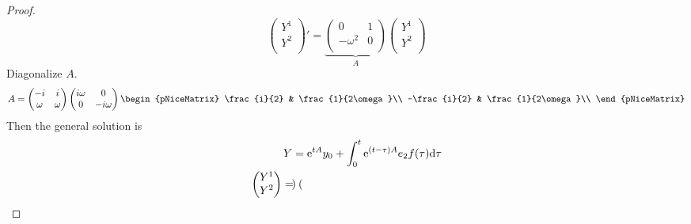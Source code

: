 \documentclass[../psets.tex]{subfiles}
\begin{document}
\begin{enumerate}
\begin{proof}
        \begin{equation*}
            \begin{pmatrix}
                Y^1\\
                Y^2\\
            \end{pmatrix}'
            = \underbrace{
                \begin{pmatrix}
                    0 & 1\\
                    -\omega^2 & 0\\
                \end{pmatrix}
            }_A
            \begin{pmatrix}
                Y^1\\
                Y^2\\
            \end{pmatrix}
        \end{equation*}
        Diagonalize $A$.
        \begin{equation*}
            A =
            \begin{pmatrix}
                -i & i\\
                \omega & \omega\\
            \end{pmatrix}
            \begin{pmatrix}
                i\omega & 0\\
                0 & -i\omega\\
            \end{pmatrix}
            \begin{pNiceMatrix}
                \frac{i}{2} & \frac{1}{2\omega}\\
                -\frac{i}{2} & \frac{1}{2\omega}\\
            \end{pNiceMatrix}
        \end{equation*}
        Then the general solution is
        \begin{align*}
            Y ={}& \e[tA]y_0+\int_0^t\e[(t-\tau)A]e_2f(\tau)\dd\tau\\
            \begin{split}
                \begin{pmatrix}
                    Y^1\\
                    Y^2\\
                \end{pmatrix}
                ={}&
                \begin{pmatrix}

\end{pmatrix}
\end{split}
\end{align*}
\end{proof}
\end{enumerate}
\end{document}
